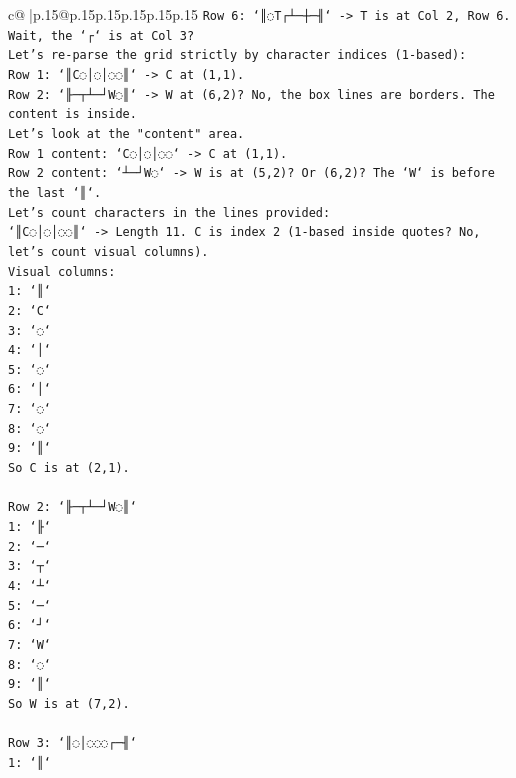 \documentclass{article}
\begin{document}
{\begin{supertabular}{c@{$\;$}|p{.15\linewidth}@{}p{.15\linewidth}p{.15\linewidth}p{.15\linewidth}p{.15\linewidth}p{.15\linewidth}}
{{{\texttt{Row 6: `║◌T┌┴─┼─╢` {-}> T is at Col 2, Row 6. Wait, the `┌` is at Col 3?} \\
\texttt{Let's re{-}parse the grid strictly by character indices (1{-}based):} \\
\texttt{Row 1: `║C◌│◌│◌◌║` {-}> C at (1,1).} \\
\texttt{Row 2: `╟─┬┴─┘W◌║` {-}> W at (6,2)? No, the box lines are borders. The content is inside.} \\
\texttt{Let's look at the "content" area.} \\
\texttt{Row 1 content: `C◌│◌│◌◌` {-}> C at (1,1).} \\
\texttt{Row 2 content: `┴─┘W◌` {-}> W is at (5,2)? Or (6,2)? The `W` is before the last `║`.} \\
\texttt{Let's count characters in the lines provided:} \\
\texttt{`║C◌│◌│◌◌║` {-}> Length 11. C is index 2 (1{-}based inside quotes? No, let's count visual columns).} \\
\texttt{Visual columns:} \\
\texttt{1: `║`} \\
\texttt{2: `C`} \\
\texttt{3: `◌`} \\
\texttt{4: `│`} \\
\texttt{5: `◌`} \\
\texttt{6: `│`} \\
\texttt{7: `◌`} \\
\texttt{8: `◌`} \\
\texttt{9: `║`} \\
\texttt{So C is at (2,1).} \\
\\ 
\texttt{Row 2: `╟─┬┴─┘W◌║`} \\
\texttt{1: `╟`} \\
\texttt{2: `─`} \\
\texttt{3: `┬`} \\
\texttt{4: `┴`} \\
\texttt{5: `─`} \\
\texttt{6: `┘`} \\
\texttt{7: `W`} \\
\texttt{8: `◌`} \\
\texttt{9: `║`} \\
\texttt{So W is at (7,2).} \\
\\ 
\texttt{Row 3: `║◌│◌◌◌┌─╢`} \\
\texttt{1: `║`} \\
}}}
\end{supertabular}}
\end{document}
